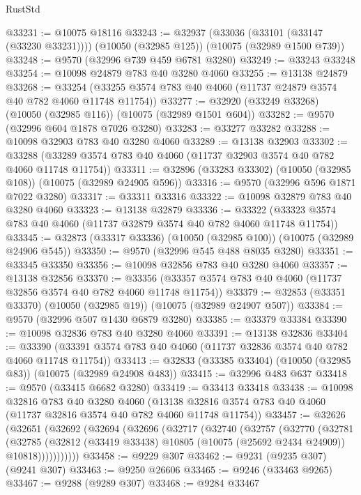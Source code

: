 \begin{lexlean}{RustStd}
\begin{coremodule}
@33231 := @10075 @18116
@33243 := @32937
    (@33036 (@33101 (@33147 (@33230 @33231))))
    (@10050 (@32985 @125))
    (@10075 (@32989 @1500 @739))
@33248 := @9570 (@32996 @739 @459 @6781 @3280)
@33249 := @33243 @33248
@33254 := @10098 @24879 @783 @40 @3280 @4060
@33255 := @13138 @24879
@33268 := @33254 (@33255 @3574 @783 @40 @4060 (@11737 @24879 @3574 @40 @782 @4060 @11748 @11754))
@33277 := @32920 (@33249 @33268) (@10050 (@32985 @116)) (@10075 (@32989 @1501 @604))
@33282 := @9570 (@32996 @604 @1878 @7026 @3280)
@33283 := @33277 @33282
@33288 := @10098 @32903 @783 @40 @3280 @4060
@33289 := @13138 @32903
@33302 := @33288 (@33289 @3574 @783 @40 @4060 (@11737 @32903 @3574 @40 @782 @4060 @11748 @11754))
@33311 := @32896 (@33283 @33302) (@10050 (@32985 @108)) (@10075 (@32989 @24905 @596))
@33316 := @9570 (@32996 @596 @1871 @7022 @3280)
@33317 := @33311 @33316
@33322 := @10098 @32879 @783 @40 @3280 @4060
@33323 := @13138 @32879
@33336 := @33322 (@33323 @3574 @783 @40 @4060 (@11737 @32879 @3574 @40 @782 @4060 @11748 @11754))
@33345 := @32873 (@33317 @33336) (@10050 (@32985 @100)) (@10075 (@32989 @24906 @545))
@33350 := @9570 (@32996 @545 @488 @8035 @3280)
@33351 := @33345 @33350
@33356 := @10098 @32856 @783 @40 @3280 @4060
@33357 := @13138 @32856
@33370 := @33356 (@33357 @3574 @783 @40 @4060 (@11737 @32856 @3574 @40 @782 @4060 @11748 @11754))
@33379 := @32853 (@33351 @33370) (@10050 (@32985 @19)) (@10075 (@32989 @24907 @507))
@33384 := @9570 (@32996 @507 @1430 @6879 @3280)
@33385 := @33379 @33384
@33390 := @10098 @32836 @783 @40 @3280 @4060
@33391 := @13138 @32836
@33404 := @33390 (@33391 @3574 @783 @40 @4060 (@11737 @32836 @3574 @40 @782 @4060 @11748 @11754))
@33413 := @32833 (@33385 @33404) (@10050 (@32985 @83)) (@10075 (@32989 @24908 @483))
@33415 := @32996 @483 @637
@33418 := @9570 (@33415 @6682 @3280)
@33419 := @33413 @33418
@33438 := @10098
    @32816
    @783
    @40
    @3280
    @4060
    (@13138 @32816 @3574 @783 @40 @4060 (@11737 @32816 @3574 @40 @782 @4060 @11748 @11754))
@33457 := @32626
    (@32651
      (@32692
        (@32694
          (@32696
            (@32717
              (@32740
                (@32757
                  (@32770
                    (@32781
                      (@32785
                        (@32812
                          (@33419 @33438)
                          @10805
                          (@10075 (@25692 @2434 @24909))
                          @10818)))))))))))
@33458 := @9229 @307
@33462 := @9231 (@9235 @307) (@9241 @307)
@33463 := @9250 @26606
@33465 := @9246 (@33463 @9265)
@33467 := @9288 (@9289 @307)
@33468 := @9284 @33467

\end{coremodule}
\end{lexlean}
